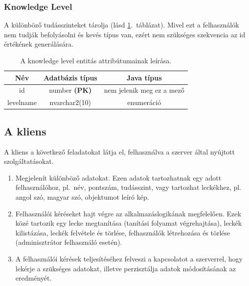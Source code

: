 \documentclass[11pt, a4paper]{article}
\begin{document}
    \subsubsection{Knowledge Level}
    A különböző tudásszinteket tárolja (lásd \ref{tab:knowledge-level}.~táblázat). Mivel ezt a felhasználók nem tudják befolyásolni és kevés típus van, ezért nem szükséges szekvencia az id értékének generálására.
    
    \begin{table}[!h]
    	\centering
    	\begin{tabular} {|c|c|c|}
    		\hline
    		Név & Adatbázis típus & Java típus \\
    		\hline
    		id & number \textbf{(PK)} & nem jelenik meg ez a mező \\
    		levelname & nvarchar2(10) & enumeráció \\
    		\hline
    	\end{tabular}
   	 	\caption{A knowledge level entitás attribútumainak leírása.}
		\label{tab:knowledge-level}
    \end{table}
    
    \subsection{A kliens}
    \label{sec:kliens}
    A kliens a következő feladatokat látja el, felhasználva a szerver által nyújtott szolgáltatásokat.
    \begin{enumerate}
    	\item Megjelenít különböző adatokat. Ezen adatok tartozhatnak egy adott felhasználóhoz, pl.~név, pontszám, tudásszint, vagy tartozhat leckékhez, pl. angol szó, magyar szó, objektumot leíró kép.
    	\item Felhasználói kéréseket hajt végre az alkalmazáslogikának megfelelően. Ezek közé tartozik egy lecke megtanítása (tanítási folyamat végrehajtása), leckék kilistázása, leckék felvétele és törlése, felhasználók létrehozása és törlése (adminisztrátor felhasználó esetén).
    	\item A felhasználói kérések teljesítéséhez felveszi a kapcsolatot a szerverrel, hogy lekérje a szükséges adatokat, illetve perzisztálja adatok módosításának az eredményét.
    \end{enumerate}
\end{document}
